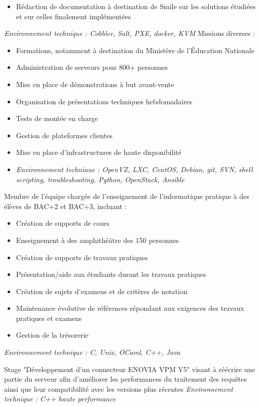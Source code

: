 \documentclass[10pt,a4paper]{moderncv}
\begin{document}
{\begin{itemize}
    \item Rédaction de documentation à destination de Smile sur les solutions
      étudiées et sur celles finalement implémentées
  \end{itemize}
  \emph{Environnement technique : Cobbler, Salt, PXE, docker, KVM}
  \newline Missions diverses :
  \begin{itemize}
    \item Formations, notamment à destination du Ministère de l'Éducation
      Nationale
    \item Administration de serveurs pour 800+ personnes
    \item Mise en place de démonstrations à but avant-vente
    \item Organisation de présentations techniques hebdomadaires
    \item Tests de montée en charge
    \item Gestion de plateformes clientes
    \item Mise en place d'infrastructures de haute disponibilité
    \item \emph{Environnement techniaue : OpenVZ, LXC, CentOS, Debian, git,
      SVN, shell scripting, troubleshooting, Python, OpenStack, Ansible}
  \end{itemize}
}

{Membre de l'équipe chargée de l'enseignement de l'informatique pratique à des
élèves de BAC+2 et BAC+3, incluant :
\begin{itemize}
\item Création de supports de cours
\item Enseignement à des amphithéâtre des 150 personnes
\item Création de supports de travaux pratiques
\item Présentation/aide aux étudiants durant les travaux pratiques
\item Création de sujets d'examens et de critères de notation
\item Maintenance évolutive de références répondant aux exigences des travaux
pratiques et examens
\item Gestion de la trésorerie
\end{itemize}
\emph{Environnement technique : C, Unix, OCaml, C++, Java}}

{Stage "Développement d'un connecteur ENOVIA VPM V5" visant à réécrire une
partie du serveur afin d'améliorer les performances du traitement des requêtes
ainsi que leur compatibilité avec les versions plus récentes
\newline\emph{Environnement technique : C++ haute performance}}
\end{document}
